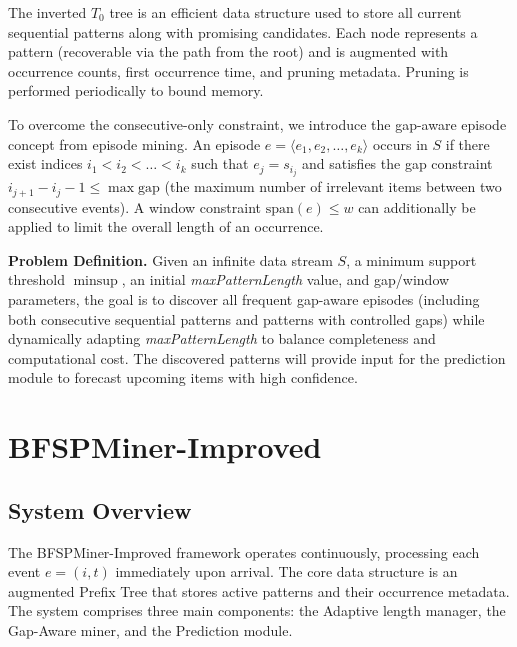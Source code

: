 \documentclass[conference]{IEEEtran}
\begin{document}
The inverted $T_0$ tree is an efficient data structure used to store all current sequential patterns along with promising candidates. Each node represents a pattern (recoverable via the path from the root) and is augmented with occurrence counts, first occurrence time, and pruning metadata. Pruning is performed periodically to bound memory.

To overcome the consecutive-only constraint, we introduce the gap-aware episode concept from episode mining. An episode $e = \langle e_1, e_2, \dots, e_k \rangle$ occurs in $S$ if there exist indices $i_1 < i_2 < \dots < i_k$ such that $e_j = s_{i_j}$ and satisfies the gap constraint $i_{j+1} - i_j - 1 \leq \max\text{gap}$ (the maximum number of irrelevant items between two consecutive events). A window constraint $\text{span}(e) \leq w$ can additionally be applied to limit the overall length of an occurrence.

\textbf{Problem Definition.} Given an infinite data stream $S$, a minimum support threshold $\min\text{sup}$, an initial \textit{maxPatternLength} value, and gap/window parameters, the goal is to discover all frequent gap-aware episodes (including both consecutive sequential patterns and patterns with controlled gaps) while dynamically adapting \textit{maxPatternLength} to balance completeness and computational cost. The discovered patterns will provide input for the prediction module to forecast upcoming items with high confidence.

\section{BFSPMiner-Improved}
\label{sec:proposed}

\subsection{System Overview}
The BFSPMiner-Improved framework operates continuously, processing each event $e = (i, t)$ immediately upon arrival. The core data structure is an augmented Prefix Tree that stores active patterns and their occurrence metadata. The system comprises three main components: the Adaptive length manager, the Gap-Aware miner, and the Prediction module.
\end{document}
